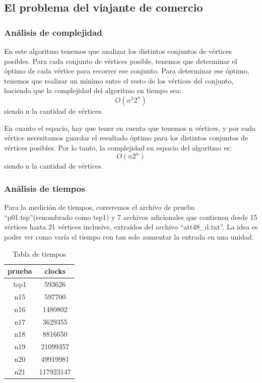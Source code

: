 \newpage

\subsection{El problema del viajante de comercio}
\subsubsection{Análisis de complejidad}
En este algoritmo tenemos que analizar los distintos conjuntos de vértices posibles. Para cada conjunto de vértices posible, tenemos que determinar el óptimo de cada vértice para recorrer ese conjunto.
Para determinar ese óptimo, tenemos que realizar un mínimo entre el resto de los vértices del conjunto, haciendo que la complejidad del algoritmo en tiempo sea:
$$O(n^2 2^n)$$
siendo n la cantidad de vértices.

En cuanto el espacio, hay que tener en cuenta que tenemos n vértices, y por cada vértice necesitamos guardar el resultado óptimo para los distintos conjuntos de vértices posibles.
Por lo tanto, la complejidad en espacio del algoritmo es:
$$O(n 2^n)$$
siendo n la cantidad de vértices.

\subsubsection{Análisis de tiempos}
Para la medición de tiempos, correremos el archivo de prueba ``p01.tsp''(renombrado como tsp1) y 7 archivos adicionales que contienen desde 15 vértices hasta 21 vértices inclusive, 
extraídos del archivo
``att48\_d.txt''.
La idea es poder ver como varía el tiempo con tan solo aumentar la entrada en una unidad.
\begin{table}[H]
\centering
\begin{tabular}{|c|c|}
\hline
\textbf{prueba} & \textbf{clocks} \\ \hline
tsp1            & 593626          \\ \hline
n15             & 597700          \\ \hline
n16             & 1480802         \\ \hline
n17             & 3629355         \\ \hline
n18             & 8816650         \\ \hline
n19             & 21099357        \\ \hline
n20             & 49919981        \\ \hline
n21             & 117923147       \\ \hline
\end{tabular}
\caption{Tabla de tiempos}
\end{table}

